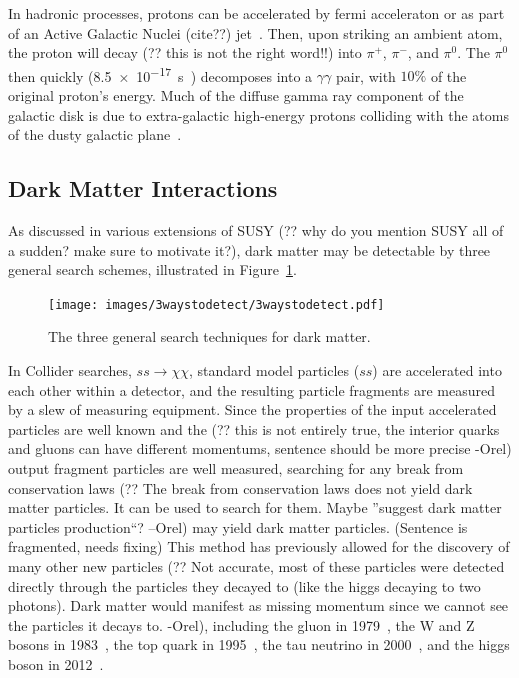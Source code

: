   In hadronic processes, protons can be accelerated by fermi acceleraton or as part of an {\color{red}Active Galactic Nuclei (cite??)} jet~\cite{hadronic1,hadronic2}.
  Then, upon striking an ambient atom, the proton will {\color{red}decay (?? this is not the right word!!)} into $\pi^{+}$, $\pi^{-}$, and $\pi^{0}$.
  The $\pi^{0}$ then quickly (\SI{8.5e-17}{s}~\cite{pdg2016}) decomposes into a $\gamma\gamma$ pair, with \nicetilde$10\%$ of the original proton's energy.
  Much of the diffuse gamma ray component of the galactic disk is due to extra-galactic high-energy protons colliding with the atoms of the dusty galactic plane~\cite{GalacticDiffuseGammaRays}.

  \subsection{Dark Matter Interactions}\label{dmgammaproduction}
    {\color{red}As discussed in various extensions of SUSY (?? why do you mention SUSY all of a sudden? make sure to motivate it?)}, dark matter may be detectable by three general search schemes, illustrated in Figure~\ref{fig:3_searches}.

    \begin{figure}[ht]
      \centering
      \texttt{[image: images/3waystodetect/3waystodetect.pdf]}
      \caption[3 Search Techniques]{
        The three general search techniques for dark matter.}
      \label{fig:3_searches}
    \end{figure}

    In Collider searches, $ss \rightarrow \chi\chi$, standard model particles ($ss$) are accelerated into each other within a detector, and the resulting particle fragments are measured by a slew of measuring equipment.
    {\color{red}Since the properties of the input accelerated particles are well known and the (?? this is not entirely true, the interior quarks and gluons can have different momentums, sentence should be more precise -Orel)} output fragment particles are well measured, searching for any break from {\color{red}conservation laws (?? The break from conservation laws does not yield dark matter particles. It can be used to search for them. Maybe ''suggest dark matter particles production``? --Orel)} may yield dark matter particles. {\color{red}(Sentence is fragmented, needs fixing)}
    {\color{red}This method has previously allowed for the discovery of many other new particles (?? Not accurate, most of these particles were detected directly through the particles they decayed to (like the higgs decaying to two photons). Dark matter would manifest as missing momentum since we cannot see the particles it decays to. -Orel)}, including the gluon in 1979~\cite{gluon_discovery}, the W and Z bosons in 1983~\cite{WZ_discovery1,WZ_discovery2}, the top quark in 1995~\cite{top_discovery}, the tau neutrino in 2000~\cite{tau_neutrino_discovery}, and the higgs boson in 2012~\cite{Higgs_ATLAS,Higgs_CMS}.

